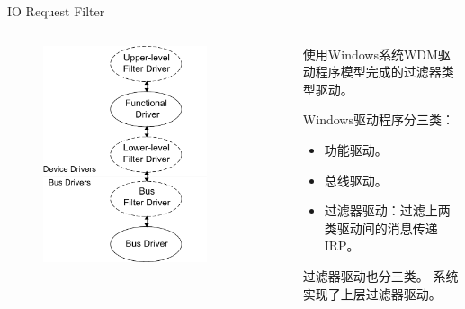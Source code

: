 \documentclass[compress]{beamer}
\begin{document}
\begin{frame}{IO Request Filter}
    \begin{columns}
    \begin{column}{0.5\textwidth}
        \begin{figure}
        \includegraphics[width=0.8\textwidth]{../graph/io-stack-filter}
        \end{figure}
    \end{column}
    \begin{column}{0.5\textwidth}
        使用Windows系统WDM驱动程序模型完成的过滤器类型驱动。

        Windows驱动程序分三类：
        \begin{itemize}
        \item 功能驱动。
        \item 总线驱动。
        \item 过滤器驱动：过滤上两类驱动间的消息传递IRP。
        \end{itemize}

        过滤器驱动也分三类。
        系统实现了上层过滤器驱动。
    \end{column}
    \end{columns}
\end{frame}
\end{document}
